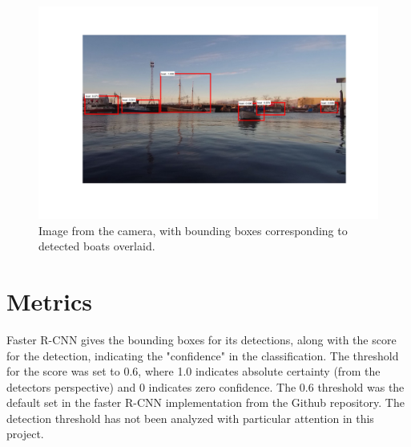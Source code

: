 \begin{figure}[H]
		\centering
		\includegraphics[width=\linewidth]{fig/proj_example_im.png}
		\caption{Image from the camera, with bounding boxes corresponding to detected boats overlaid.}
		\label{fig:sub_proj_ex2}
\end{figure}

\section{Metrics}
Faster R-CNN gives the bounding boxes for its detections, along with the score for the detection, indicating the "confidence" in the classification. The threshold for the score was set to 0.6, where 1.0 indicates absolute certainty (from the detectors perspective) and 0 indicates zero confidence. The 0.6 threshold was the default set in the faster R-CNN implementation from the Github repository. The detection threshold has not been analyzed with particular attention in this project.

